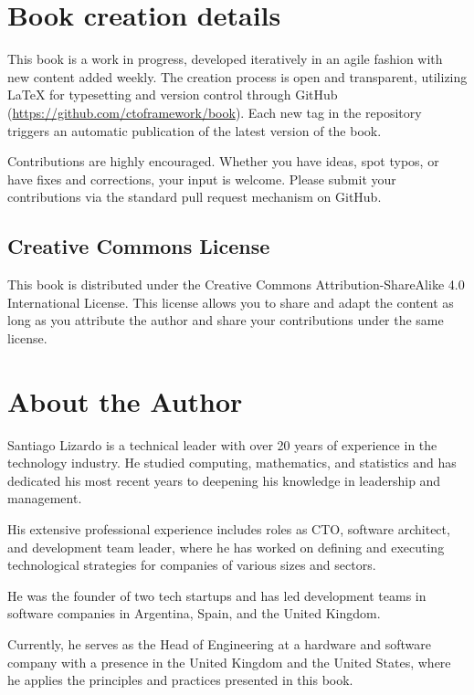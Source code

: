 \appendix
\section*{Book creation details}

This book is a work in progress, developed iteratively in an agile fashion with new content added weekly. The creation process is open and transparent, utilizing \LaTeX{} for typesetting and version control through GitHub (\url{https://github.com/ctoframework/book}). Each new tag in the repository triggers an automatic publication of the latest version of the book.

Contributions are highly encouraged. Whether you have ideas, spot typos, or have fixes and corrections, your input is welcome. Please submit your contributions via the standard pull request mechanism on GitHub.

\subsection*{Creative Commons License}

This book is distributed under the Creative Commons Attribution-ShareAlike 4.0 International License. This license allows you to share and adapt the content as long as you attribute the author and share your contributions under the same license.

\section*{About the Author}

Santiago Lizardo is a technical leader with over 20 years of experience in the technology industry. He studied computing, mathematics, and statistics and has dedicated his most recent years to deepening his knowledge in leadership and management.

His extensive professional experience includes roles as CTO, software architect, and development team leader, where he has worked on defining and executing technological strategies for companies of various sizes and sectors.

He was the founder of two tech startups and has led development teams in software companies in Argentina, Spain, and the United Kingdom.

Currently, he serves as the Head of Engineering at a hardware and software company with a presence in the United Kingdom and the United States, where he applies the principles and practices presented in this book.
